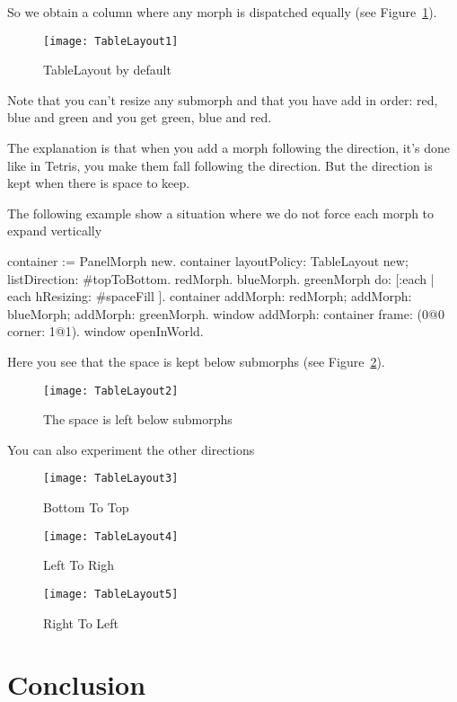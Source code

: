\documentclass[a4paper,10pt,twoside]{book}
\begin{document}
So we obtain a column where any morph is dispatched equally (see Figure~\ref{fig:tableLayout1}).

\begin{figure}[ht]\centering
	\texttt{[image: TableLayout1]}
	\caption{TableLayout by default}
	\label{fig:tableLayout1}
\end{figure}

Note that you can't resize any submorph and that you have add in order:
red, blue and green and you get 
green, blue and  red.

The explanation is that when you add a morph following the direction, it's done like in Tetris, you make them fall following the direction. But the direction is kept when there is space to keep.


The following example show a situation  where we do not force each morph to expand vertically
\begin{code}{}
container := PanelMorph new.
container 
	layoutPolicy: TableLayout new;
	listDirection: #topToBottom.
{ redMorph. blueMorph. greenMorph } do: [:each |
	each hResizing: #spaceFill ].
container 
	addMorph: redMorph;
	addMorph: blueMorph;
	addMorph: greenMorph.
window
	addMorph: container
	frame: (0@0 corner: 1@1).
window openInWorld.
\end{code}

Here you see that the space is kept below submorphs (see Figure~\ref{fig:tableLayout2}).

\begin{figure}[ht]\centering
	\texttt{[image: TableLayout2]}
	\caption{The space is left below submorphs}
	\label{fig:tableLayout2}
\end{figure}

You can also experiment the other directions

\begin{figure}[ht]\centering
	\texttt{[image: TableLayout3]}
	\caption{Bottom To Top}
	\label{fig:tableLayout3}
	\texttt{[image: TableLayout4]}
	\caption{Left To Righ}
	\label{fig:tableLayout4}
	\texttt{[image: TableLayout5]}
	\caption{Right To Left}
	\label{fig:tableLayout5}
\end{figure}


\section{Conclusion}

\ifx\wholebook\relax\else
   
   
\end{document}
